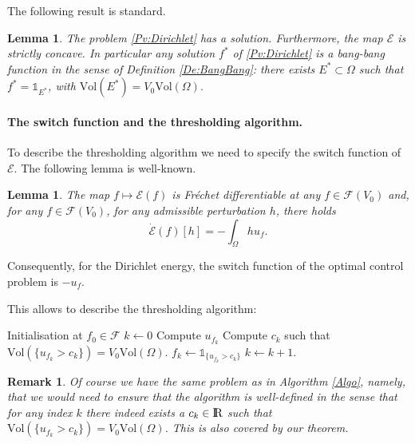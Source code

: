 \documentclass{article}
\newcommand{\R}{\textnormal{I\kern-0.21emR}}
\newtheorem{lemma}[material]{Lemma}
\newtheorem{remark}[material]{Remark}
\def\O{{\Omega}}
\numberwithin{equation}{section}
\begin{document}
The following result is standard.
\begin{lemma}\label{Le:BasicDirichlet}
The problem \eqref{Pv:Dirichlet} has a solution. Furthermore, the map $\mathscr E$ is strictly concave. In particular any solution $f^*$ of \eqref{Pv:Dirichlet} is a bang-bang function in the sense of Definition \ref{De:BangBang}: there exists $E^*\subset \O$ such that $f^*=\mathds 1_{E^*}$, with $\mathrm{Vol}(E^*)=V_0\mathrm{Vol}(\O).$ 
\end{lemma}

\paragraph{The switch function and the thresholding algorithm.}
To describe the thresholding algorithm we need to specify the switch function of $\mathscr E$. The following lemma is well-known.%
\begin{lemma}\label{Le:SwitchDirichlet}
The map $f\mapsto \mathscr E(f)$ is Fr\'echet differentiable at any $f\in \mathcal F(V_0)$ and, for any $f\in \mathcal F(V_0)$, for any admissible perturbation $h$, there holds
\[ \dot{\mathscr E}(f)[h]=-\int_\O h u_f.\]
\end{lemma}
Consequently, for the Dirichlet energy, the switch function of the optimal control problem is  $-u_f$. {This allows to describe the thresholding algorithm:
\begin{algorithm}[H]
\caption{Thresholding algorithm for the Dirichlet energy}\label{Algo:Dirichlet}
\begin{algorithmic}[1]
\State Initialisation at $f_0\in \mathcal F$
\State $k\gets 0$
\State Compute $u_{f_k}$
\State Compute $c_k$ such that $\mathrm{Vol}(\{u_{f_k}>c_k\})=V_0\mathrm{Vol}(\O)$.
\State $f_k\gets \mathds 1_{\{u_{f_k}>c_k\}}$
\State $k\gets k+1$.
\end{algorithmic}
\end{algorithm}}



\medskip
\begin{remark}\label{Re:DirichletWell?}
Of course we have the same problem as in Algorithm \ref{Algo}, namely, that we would need to ensure that the algorithm is well-defined in the sense that for any index $k$ there indeed exists a $c_k\in \R$ such that $\mathrm{Vol}(\{u_{f_k}>c_k\})=V_0\mathrm{Vol}(\O)$. This is also covered by our theorem.
\end{remark}
\end{document}
